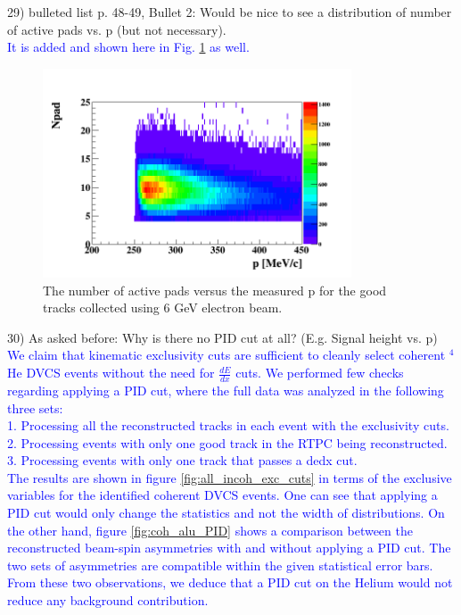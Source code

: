 29) bulleted list p. 48-49, Bullet 2: Would be nice to see a distribution of 
number of active pads vs. p (but not necessary).\\
\textcolor{blue}{It is added and shown here in Fig. \ref{fig:padnb} as well.}\\

\begin{figure}[tbp]
\centering
\includegraphics[height=6.2cm]{fig/npd_p_elastic.png}
\caption{The number of active pads versus the measured p for the good tracks 
collected using 6 GeV electron beam.}
\label{fig:padnb}
\end{figure}

30) As asked before: Why is there no PID cut at all? (E.g. Signal height vs.  
p)\\
\textcolor{blue}{We claim that kinematic exclusivity cuts are sufficient to
cleanly select coherent $^4$He DVCS events without the need for $\frac{dE}{dx}$ 
cuts. We performed few checks regarding applying a PID cut, where the full data 
was analyzed in the following three sets:\\
1. Processing all the reconstructed tracks in each event with the exclusivity 
cuts.\\
2. Processing events with only one good track in the RTPC being 
reconstructed.\\
3. Processing events with only one track that passes a dedx cut.\\
The results are shown in figure \ref{fig:all_incoh_exc_cuts} in terms of the 
exclusive variables for the identified coherent DVCS events. One can see that 
applying a PID cut would only change the statistics and not the width of 
distributions. On the other hand, figure 
\ref{fig:coh_alu_PID} shows a comparison between the reconstructed beam-spin 
asymmetries with and without applying a PID cut. The two sets 
of asymmetries are compatible within the given statistical error bars.
From these two observations, we deduce that a PID cut on the Helium would
not reduce any background contribution.}\\

